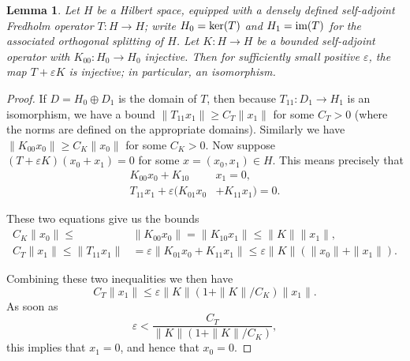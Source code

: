\documentclass{memo-l}
\newtheorem{lemma}[theorem]{Lemma}
\theoremstyle{definition}
\theoremstyle{remark}
\numberwithin{section}{chapter}
\numberwithin{equation}{chapter}
\begin{document}
\begin{lemma}\label{cpert}Let $H$ be a Hilbert space, equipped with a densely defined self-adjoint Fredholm operator $T: H \to H$; write $H_0 = \textup{ker}(T)$ and $H_1 = \textup{im}(T)$ for the associated orthogonal splitting of $H$. Let $K: H \to H$ be a bounded self-adjoint operator with $K_{00}: H_0 \to H_0$ injective. Then for sufficiently small positive $\varepsilon$, the map $T + \varepsilon K$ is injective; in particular, an isomorphism. 
\end{lemma}
\begin{proof}If $D = H_0 \oplus D_1$ is the domain of $T$, then because $T_{11}: D_1 \to H_1$ is an isomorphism, we have a bound $\|T_{11} x_1\| \geq C_T \|x_1\|$ for some $C_T > 0$ (where the norms are defined on the appropriate domains). Similarly we have $\|K_{00} x_0\| \geq C_K \|x_0\|$ for some $C_K > 0$. Now suppose $(T + \varepsilon K)(x_0 + x_1) = 0$ for some $x = (x_0, x_1) \in H$. This means precisely that 
\begin{align*}K_{00} x_0 + K_{10} &x_1 = 0,\\
T_{11} x_1 + \varepsilon (K_{01} x_0 &+ K_{11} x_1) = 0.
\end{align*}

These two equations give us the bounds 
\begin{align*}
C_K \|x_0\| \leq &\|K_{00} x_0\| = \|K_{10} x_1\| \leq \|K\| \|x_1\|,\\
C_T \|x_1\| \leq \|T_{11} x_1\| &= \varepsilon \|K_{01} x_0 + K_{11} x_1\| \leq \varepsilon\|K\|(\|x_0\| + \|x_1\|).
\end{align*}

Combining these two inequalities we then have $$C_T \|x_1\| \leq \varepsilon \|K\| (1 + \|K\|/C_K) \|x_1\|.$$ As soon as $$\varepsilon < \frac{C_T}{\|K\| (1 + \|K\|/C_K)},$$ this implies that $x_1 = 0$, and hence that $x_0 = 0$. 
\end{proof}
\end{document}
